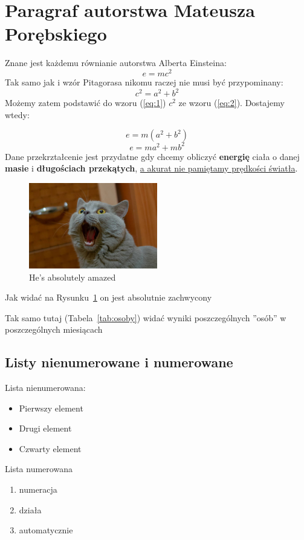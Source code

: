 
\section{Paragraf autorstwa Mateusza Porębskiego}

Znane jest każdemu równianie autorstwa Alberta Einsteina:
    \begin{equation} \label{eq:1}
        e = mc^2 
    \end{equation}
    Tak samo jak i wzór Pitagorasa nikomu raczej nie musi być przypominany:
    \begin{equation} \label{eq:2}
        c^2 = a^2 + b^2
    \end{equation} 
    Możemy zatem podstawić do wzoru (\ref{eq:1}) $c^2$ ze wzoru (\ref{eq:2}). Dostajemy wtedy:

    \begin{equation} \label{eq:3}
        e = m(a^2 + b^2)
    \end{equation}
    \begin{equation} \label{eq:4}
        e = ma^2 + mb^2
    \end{equation}
    Dane przekrztałcenie jest przydatne gdy chcemy obliczyć \textbf{energię} ciała o danej \textbf{masie} i \textbf{długościach przekątych}, \underline{a akurat nie pamiętamy prędkości światła}.
    \begin{figure}[htbp]
        \centering
        \includegraphics[width=0.5\textwidth]{pictures/heckin_cute.jpg}
        \caption{He's absolutely amazed}
        \label{fig:hecingcute}
    \end{figure}


Jak widać na Rysunku~\ref{fig:hecingcute} on jest absolutnie zachwycony


Tak samo tutaj (Tabela~\ref{tab:osoby}) widać wyniki poszczególnych ''osób'' w poszczególnych miesiącach

\subsection{Listy nienumerowane i numerowane}

Lista nienumerowana:
\begin{itemize} \label{nienumerowana}
  \item Pierwszy element
  \item Drugi element
  \item Czwarty element
\end{itemize}

Lista numerowana
\begin{enumerate}
    \item numeracja 
    \item działa
    \item automatycznie
\end{enumerate}
